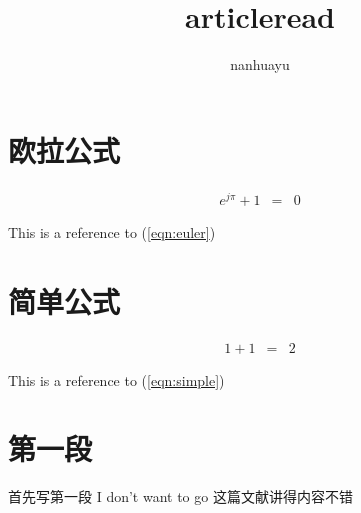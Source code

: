 \documentclass[UTF8]{article}
\begin{document}
\title{articleread}
\author{nanhuayu}
\maketitle

\section{欧拉公式}

\begin{eqnarray}
    \label{eqn:euler}
    e^{j\pi} + 1 &=& 0
\end{eqnarray}

This is a reference to (\ref{eqn:euler})

\section{简单公式}

\begin{eqnarray}
    \label{eqn:simple}
    1 + 1 &=& 2
\end{eqnarray}

This is a reference to (\ref{eqn:simple})

\section{第一段}
首先写第一段
I don't want to go
这篇文献讲得内容不错
\end{document}
